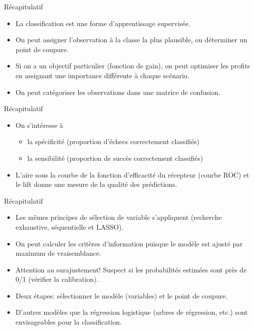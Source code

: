 \documentclass[
  ignorenonframetext,
]{beamer}
\providecommand{\tightlist}{%
  \setlength{\itemsep}{0pt}\setlength{\parskip}{0pt}}\usepackage{longtable,booktabs,array}
\begin{document}
\begin{frame}{Récapitulatif}
\protect\hypertarget{ruxe9capitulatif}{}
\begin{itemize}
\tightlist
\item
  La classification est une forme d'apprentissage supervisée.
\item
  On peut assigner l'observation à la classe la plus plausible, ou
  déterminer un point de coupure.
\item
  Si on a un objectif particulier (fonction de gain), on peut optimiser
  les profits en assignant une importance différente à chaque scénario.
\item
  On peut catégoriser les observations dans une matrice de confusion.
\end{itemize}
\end{frame}

\begin{frame}{Récapitulatif}
\protect\hypertarget{ruxe9capitulatif-1}{}
\begin{itemize}
\tightlist
\item
  On s'intéresse à

  \begin{itemize}
  \tightlist
  \item
    la spécificité (proportion d'échecs correctement classifiés)
  \item
    la sensibilité (proportion de succès correctement classifiés)
  \end{itemize}
\item
  L'aire sous la courbe de la fonction d'efficacité du récepteur (courbe
  ROC) et le lift donne une mesure de la qualité des prédictions.
\end{itemize}
\end{frame}

\begin{frame}{Récapitulatif}
\protect\hypertarget{ruxe9capitulatif-2}{}
\begin{itemize}
\tightlist
\item
  Les mêmes principes de sélection de variable s'appliquent (recherche
  exhaustive, séquentielle et LASSO).
\item
  On peut calculer les critères d'information puisque le modèle est
  ajusté par maximum de vraisemblance.
\item
  Attention au surajustement! Suspect si les probabilités estimées sont
  près de 0/1 (vérifier la calibration).
\item
  Deux étapes: sélectionner le modèle (variables) et le point de
  coupure.
\item
  D'autres modèles que la régression logistique (arbres de régression,
  etc.) sont envisageables pour la classification.
\end{itemize}
\end{frame}
\end{document}

